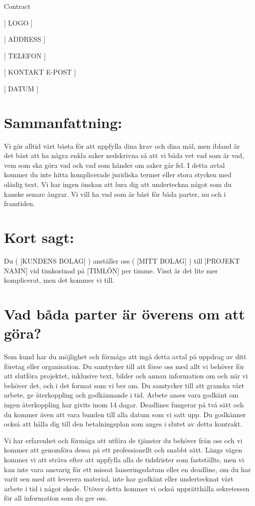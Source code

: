 \documentclass[10pt,a4paper,parskip]{scrartcl}
\begin{document}
\begin{center} {\Large Contract} \end{center}

[ LOGO ]

[ ADDRESS ]

[ TELEFON ]

[ KONTAKT E-POST ]

[ DATUM ]

\section{Sammanfattning:}

Vi gör alltid vårt bästa för att uppfylla dina krav och dina mål,
men ibland är det bäst att ha några enkla saker nedskrivna så att vi båda vet
vad som är vad, vem som ska göra vad och vad som händer om saker går fel. I
detta avtal kommer du inte hitta komplicerade juridiska termer eller stora
stycken med oläslig text. Vi har ingen önskan att lura dig att underteckna
något som du kanske senare ångrar. Vi vill ha vad som är bäst för båda parter,
nu och i framtiden.

\section{Kort sagt:}

Du ( [KUNDENS BOLAG] ) anställer oss ( [MITT BOLAG] ) till [PROJEKT NAMN] vid
timkostnad på [TIMLÖN] per timme. Visst är det lite mer komplicerat, men det
kommer vi till.

\section{Vad båda parter är överens om att göra?}

Som kund har du möjlighet och förmåga att ingå detta avtal på uppdrag av ditt
företag eller organisation. Du samtycker till att förse oss med allt vi
behöver för att slutföra projektet, inklusive text, bilder och annan
information om och när vi behöver det, och i det format som vi ber om. Du
samtycker till att granska vårt arbete, ge återkoppling och godkännande i tid.
Arbete anses vara godkänt om ingen återkoppling har givits inom 14 dagar.
Deadlines fungerar på två sätt och du kommer även att vara bunden till alla
datum som vi satt upp. Du godkänner också att hålla dig till den betalningsplan
som anges i slutet av detta kontrakt.

Vi har erfarenhet och förmåga att utföra de tjänster du behöver från oss och vi
kommer att genomföra dessa på ett professionellt och snabbt sätt. Längs vägen
kommer vi att sträva efter att uppfylla alla de tidsfrister som fastställts,
men vi kan inte vara ansvarig för ett missat lanseringsdatum eller en deadline,
om du har varit sen med att leverera material, inte har godkänt eller
undertecknat vårt arbete i tid i något skede. Utöver detta kommer vi också
upprätthålla sekretessen för all information som du ger oss.
\end{document}
